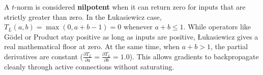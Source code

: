 A $t$-norm is considered \textbf{nilpotent} when it can return zero for inputs that are strictly greater than zero. In the \L{}ukasiewicz case, $T_L(a, b) = \max(0, a + b - 1) = 0$ whenever $a + b \le 1$. While operators like G\"odel or Product stay positive as long as inputs are positive, \L{}ukasiewicz gives a real mathematical floor at zero. At the same time, when $a + b > 1$, the partial derivatives are constant ($\frac{\partial T_L}{\partial a} = \frac{\partial T_L}{\partial b} = 1.0$). This allows gradients to backpropagate cleanly through active connections without saturating.
